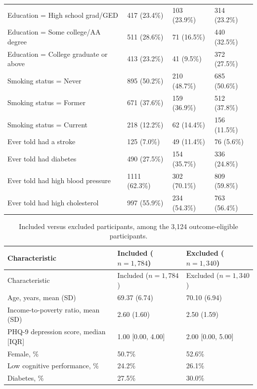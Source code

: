 \documentclass[12pt]{article}
\providecommand{\DIFaddbegin}{} %
\providecommand{\DIFaddend}{} %
\providecommand{\DIFaddincludegraphics}[2][]{{\color{blue}\fbox{\DIFOincludegraphics[#1]{#2}}}} %
\DeclareRobustCommand{\DIFaddbegin}{\DIFOaddbegin \let\includegraphics\DIFaddincludegraphics} %
\DeclareRobustCommand{\DIFaddend}{\DIFOaddend \let\includegraphics\DIFOincludegraphics} %
\begin{document}
\begin{singlespace}
\begin{longtable}{L{4.6cm}R{3.35cm}R{3.35cm}R{3.35cm}}
Education = High school grad/GED & 417 (23.4\%) & 103 (23.9\%) & 314 (23.2\%) \\
Education = Some college/AA degree & 511 (28.6\%) & 71 (16.5\%) & 440 (32.5\%) \\
Education = College graduate or above & 413 (23.2\%) & 41 (9.5\%) & 372 (27.5\%) \\
Smoking status = Never & 895 (50.2\%) & 210 (48.7\%) & 685 (50.6\%) \\
Smoking status = Former & 671 (37.6\%) & 159 (36.9\%) & 512 (37.8\%) \\
Smoking status = Current & 218 (12.2\%) & 62 (14.4\%) & 156 (11.5\%) \\
Ever told had a stroke & 125 (7.0\%) & 49 (11.4\%) & 76 (5.6\%) \\
Ever told had diabetes & 490 (27.5\%) & 154 (35.7\%) & 336 (24.8\%) \\
Ever told had high blood pressure & 1111 (62.3\%) & 302 (70.1\%) & 809 (59.8\%) \\
Ever told had high cholesterol & 997 (55.9\%) & 234 (54.3\%) & 763 (56.4\%) \\
\end{longtable}
\DIFaddend 

\bigskip

\begin{longtable}{p{6.0cm}R{3.5cm}R{3.5cm}}
\caption{Included versus excluded participants, among the 3,124 outcome-eligible participants.}
\label{tab:t1b}\\
\toprule
Characteristic & Included ($n=1{,}784$) & Excluded ($n=1{,}340$) \\
\midrule
\endfirsthead
\toprule
Characteristic & Included ($n=1{,}784$) & Excluded ($n=1{,}340$) \\
\midrule
\endhead
\bottomrule
\endlastfoot
Age, years, mean (SD) & 69.37 (6.74) & 70.10 (6.94) \\
Income-to-poverty ratio, mean (SD) & 2.60 (1.60) & 2.50 (1.59) \\
PHQ-9 depression score, median [IQR] & 1.00 [0.00, 4.00] & 2.00 [0.00, 5.00] \\
Female, \% & 50.7\% & 52.6\% \\
Low cognitive performance, \% & 24.2\% & 26.1\% \\
Diabetes, \% & 27.5\% & 30.0\% \\
\end{longtable}

\DIFaddbegin \bigskip


\end{singlespace}
\end{document}
